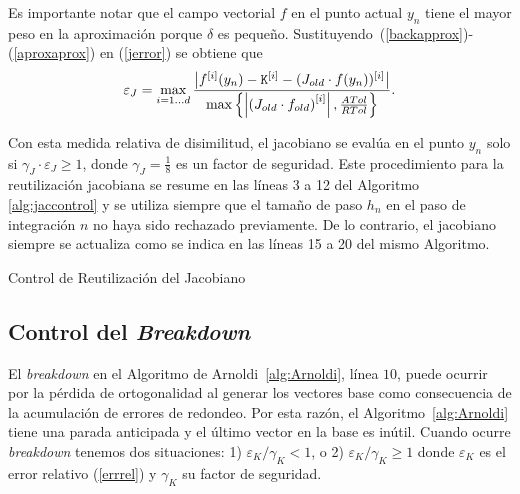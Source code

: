 Es importante notar que el campo vectorial $f$ en el punto actual $y_n$ tiene el mayor peso en la aproximación porque $\delta$
es pequeño. Sustituyendo~(\ref{backapprox})-(\ref{aproxaprox}) en (\ref{jerror}) se obtiene que
\begin{equation}\label{jerroraprox}
    \varepsilon_J = \max_{i=1\ldots d}\frac{\left\lvert f^{[i]}(y_n) - \mathtt{K}^{[i]} - (J_{old}\cdot f(y_n))^{[i]} \right\rvert}
    {\max\left\{ \left\lvert  \left(J_{old}\cdot f_{old}\right)^{[i]}  \right\rvert ,\frac{ATol}{RTol} \right\}}.
\end{equation}

Con esta medida relativa de disimilitud, el jacobiano se evalúa en el punto $y_n$ solo si $\gamma_J \cdot \varepsilon_J \geq 1$, donde $\gamma_J=\frac{1}{8}$ es un factor de seguridad. Este procedimiento para la reutilización jacobiana se resume en las líneas 3 a 12 del Algoritmo \ref{alg:jaccontrol} y se utiliza siempre que el tamaño de paso $h_n$ en el paso de integración $n$ no haya sido rechazado previamente. De lo contrario, el jacobiano siempre se actualiza como se indica en las líneas 15 a 20 del mismo Algoritmo.

{\SetAlgoNoLine
\begin{algorithm}[h]
	\caption{Control de Reutilización del Jacobiano}
	\label{alg:jaccontrol}
	{
	}
\end{algorithm}
}

\subsection{Control del \textit{Breakdown}}\label{sec:brcontrol}
El \emph{breakdown} en el Algoritmo de Arnoldi~\ref{alg:Arnoldi}, línea $10$, puede ocurrir por la pérdida de ortogonalidad al generar los vectores base como consecuencia de la acumulación de errores de redondeo. Por esta razón, el Algoritmo~\ref{alg:Arnoldi} tiene una parada anticipada y el último vector en la base es inútil. Cuando ocurre \emph{breakdown} tenemos dos situaciones: 1) $\varepsilon_{K}/\gamma_K< 1$, o 2) $\varepsilon_{K}/\gamma_K \geq 1$ donde $\varepsilon_{K}$ es el error relativo (\ref{errrel}) y $\gamma_K$ su factor de seguridad.


